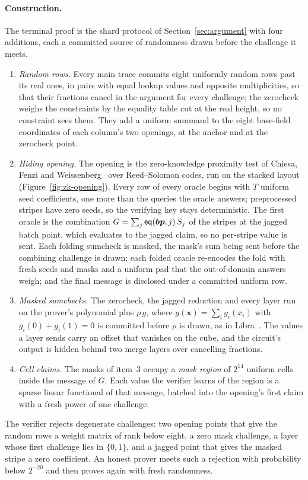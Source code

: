 \paragraph{Construction.} The terminal proof is the shard protocol of Section~\ref{sec:argument} with four additions, each a committed source of randomness drawn before the challenge it meets.
\begin{enumerate}
  \item \emph{Random rows.} Every main trace commits eight uniformly random rows past its real ones, in pairs with equal lookup values and opposite multiplicities, so that their fractions cancel in the \LogUp{} argument for every challenge; the zerocheck weighs the constraints by the equality table cut at the real height, so no constraint sees them. They add a uniform summand to the eight base-field coordinates of each column's two openings, at the \LogUp{} anchor and at the zerocheck point.
  \item \emph{Hiding opening.} The opening is the zero-knowledge proximity test of Chiesa, Fenzi and Weissenberg~\citep{cfw26} over Reed--Solomon codes, run on the stacked layout (Figure~\ref{fig:zk-opening}). Every row of every oracle begins with $T$ uniform seed coefficients, one more than the queries the oracle answers; preprocessed stripes have zero seeds, so the verifying key stays deterministic. The first oracle is the combination $G = \sum_j \mathsf{eq}(\bm{bp}, j)\, S_j$ of the stripes at the jagged batch point, which evaluates to the jagged claim, so no per-stripe value is sent. Each folding sumcheck is masked, the mask's sum being sent before the combining challenge is drawn; each folded oracle re-encodes the fold with fresh seeds and masks and a uniform pad that the out-of-domain answers weigh; and the final message is disclosed under a committed uniform row.
  \item \emph{Masked sumchecks.} The zerocheck, the jagged reduction and every \LogUp{} layer run on the prover's polynomial plus $\rho\, g$, where $g(\bm x) = \sum_i g_i(x_i)$ with $g_i(0) + g_i(1) = 0$ is committed before $\rho$ is drawn, as in Libra~\citep{libra}. The values a \LogUp{} layer sends carry an offset that vanishes on the cube, and the circuit's output is hidden behind two merge layers over cancelling fractions.
  \item \emph{Cell claims.} The masks of item~3 occupy a \emph{mask region} of $2^{14}$ uniform cells inside the message of $G$. Each value the verifier learns of the region is a sparse linear functional of that message, batched into the opening's first claim with a fresh power of one challenge.
\end{enumerate}
The verifier rejects degenerate challenges: two opening points that give the random rows a weight matrix of rank below eight, a zero mask challenge, a \LogUp{} layer whose first challenge lies in $\{0,1\}$, and a jagged point that gives the masked stripe a zero coefficient. An honest prover meets such a rejection with probability below $2^{-20}$ and then proves again with fresh randomness.

